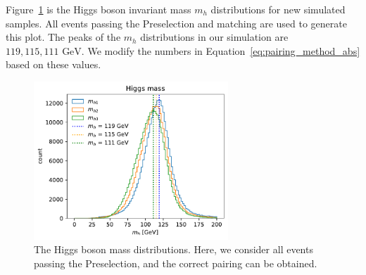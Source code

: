 \documentclass[12pt]{article}
\begin{document}
    Figure~\ref{fig:mh_distribution_new} is the Higgs boson invariant mass $m_h$ distributions for new simulated samples. All events passing the Preselection and matching are used to generate this plot. The peaks of the $m_{h}$ distributions in our simulation are $119, 115, 111 \text{ GeV}$. We modify the numbers in Equation~\ref{eq:pairing_method_abs} based on these values.
    \begin{figure}[htpb]
        \centering
        \includegraphics[width=0.65\textwidth]{mh_distribution_new.pdf}
        \caption{The Higgs boson mass distributions. Here, we consider all events passing the Preselection, and the correct pairing can be obtained.}
        \label{fig:mh_distribution_new}
    \end{figure}
\end{document}
